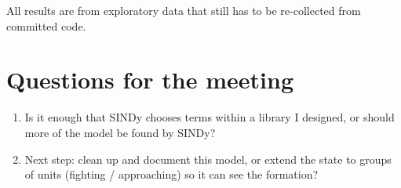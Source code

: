 \documentclass[11pt,a4paper]{article}
\begin{document}
{\small All results are from exploratory data that still has to be re-collected from committed code.}

\section*{Questions for the meeting}

\begin{enumerate}
  \item Is it enough that SINDy chooses terms within a library I designed, or should more of the model
        be found by SINDy?
  \item Next step: clean up and document this model, or extend the state to groups of units
        (fighting / approaching) so it can see the formation?
\end{enumerate}
\end{document}
